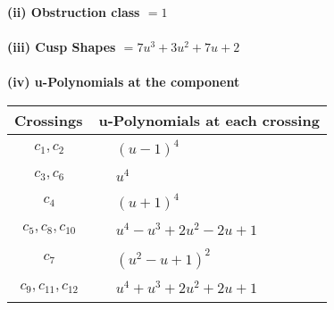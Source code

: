 \documentclass[1p]{elsarticle_modified}
\theoremstyle{definition}
\begin{document}
\flushleft \textbf{(ii) Obstruction class $= 1$}\\~\\
\flushleft \textbf{(iii) Cusp Shapes $= 7 u^3+3 u^2+7 u+2$}\\~\\
\newpage\renewcommand{\arraystretch}{1}
\flushleft \textbf{(iv) u-Polynomials at the component}\newline \\
\begin{tabular}{m{50pt}|m{274pt}}
Crossings & \hspace{64pt}u-Polynomials at each crossing \\
\hline $$\begin{aligned}c_{1},c_{2}\end{aligned}$$&$\begin{aligned}
&(u-1)^4
\end{aligned}$\\
\hline $$\begin{aligned}c_{3},c_{6}\end{aligned}$$&$\begin{aligned}
&u^4
\end{aligned}$\\
\hline $$\begin{aligned}c_{4}\end{aligned}$$&$\begin{aligned}
&(u+1)^4
\end{aligned}$\\
\hline $$\begin{aligned}c_{5},c_{8},c_{10}\end{aligned}$$&$\begin{aligned}
&u^4- u^3+2 u^2-2 u+1
\end{aligned}$\\
\hline $$\begin{aligned}c_{7}\end{aligned}$$&$\begin{aligned}
&(u^2- u+1)^2
\end{aligned}$\\
\hline $$\begin{aligned}c_{9},c_{11},c_{12}\end{aligned}$$&$\begin{aligned}
&u^4+u^3+2 u^2+2 u+1
\end{aligned}$\\
\hline
\end{tabular}\\~\\
\end{document}
